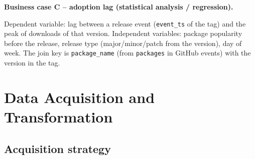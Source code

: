 \documentclass[11pt,a4paper]{article}
\newcommand{\hd}[1]{\par\Needspace{7\baselineskip}\medskip\noindent\textbf{#1}\par\nopagebreak\smallskip}
\begin{document}
\hd{Business case C -- adoption lag (statistical analysis / regression).}
Dependent variable: lag between a release event (\texttt{event\_\allowbreak{}ts} of the tag) and the peak of downloads of that version.
Independent variables: package popularity before the release, release type (major/minor/patch from the version),
day of week. The join key is \texttt{package\_\allowbreak{}name} (from \texttt{packages} in GitHub events) with the version in the tag.

\section{Data Acquisition and Transformation}\label{sec:acq}

\subsection{Acquisition strategy}
\end{document}
